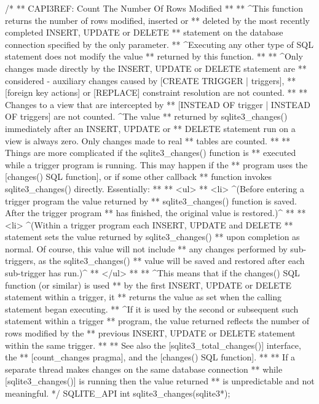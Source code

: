 \begin{Codex}[label=sqlite3.h,numbers=left]
{/*
** CAPI3REF: Count The Number Of Rows Modified
**
** ^This function returns the number of rows modified, inserted or
** deleted by the most recently completed INSERT, UPDATE or DELETE
** statement on the database connection specified by the only parameter.
** ^Executing any other type of SQL statement does not modify the value
** returned by this function.
**
** ^Only changes made directly by the INSERT, UPDATE or DELETE statement are
** considered - auxiliary changes caused by [CREATE TRIGGER | triggers], 
** [foreign key actions] or [REPLACE] constraint resolution are not counted.
** 
** Changes to a view that are intercepted by 
** [INSTEAD OF trigger | INSTEAD OF triggers] are not counted. ^The value 
** returned by sqlite3_changes() immediately after an INSERT, UPDATE or 
** DELETE statement run on a view is always zero. Only changes made to real 
** tables are counted.
**
** Things are more complicated if the sqlite3_changes() function is
** executed while a trigger program is running. This may happen if the
** program uses the [changes() SQL function], or if some other callback
** function invokes sqlite3_changes() directly. Essentially:
** 
** <ul>
**   <li> ^(Before entering a trigger program the value returned by
**        sqlite3_changes() function is saved. After the trigger program 
**        has finished, the original value is restored.)^
** 
**   <li> ^(Within a trigger program each INSERT, UPDATE and DELETE 
**        statement sets the value returned by sqlite3_changes() 
**        upon completion as normal. Of course, this value will not include 
**        any changes performed by sub-triggers, as the sqlite3_changes() 
**        value will be saved and restored after each sub-trigger has run.)^
** </ul>
** 
** ^This means that if the changes() SQL function (or similar) is used
** by the first INSERT, UPDATE or DELETE statement within a trigger, it 
** returns the value as set when the calling statement began executing.
** ^If it is used by the second or subsequent such statement within a trigger 
** program, the value returned reflects the number of rows modified by the 
** previous INSERT, UPDATE or DELETE statement within the same trigger.
**
** See also the [sqlite3_total_changes()] interface, the
** [count_changes pragma], and the [changes() SQL function].
**
** If a separate thread makes changes on the same database connection
** while [sqlite3_changes()] is running then the value returned
** is unpredictable and not meaningful.
*/
SQLITE_API int sqlite3_changes(sqlite3*);

}
\end{Codex}
